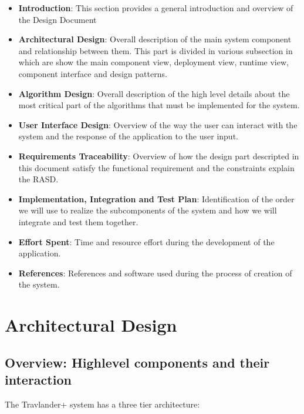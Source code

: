 \documentclass[numbers=noenddot, 12pt, a4paper, oneside]{scrbook}
\begin{document}
\begin{itemize}
	\item \textbf{Introduction}: This section provides a general introduction and overview of the Design Document
	\item \textbf{Architectural Design}: Overall description of the main system component and relationship between them. This part is divided in various subsection in which are show the main component view, deployment view, runtime view, component interface and design patterns.
	\item \textbf{Algorithm Design}: Overall description of the high level details about the most critical part of the algorithms that must be implemented for the system.
	\item \textbf{User Interface Design}: Overview of the way the user can interact with the system and the response of the application to the user input.
	\item \textbf{Requirements Traceability}: Overview of how the design part descripted in this document
	satisfy the functional requirement and the constraints explain the RASD.
	\item \textbf{Implementation, Integration and Test Plan}: Identification of the order we will use to realize the subcomponents of the system and how we will integrate and test them together.
	\item \textbf{Effort Spent}: Time and resource effort during the development of the application.
	\item \textbf{References}: References and software used during the process of creation of the system.
\end{itemize}



\chapter{Architectural Design}

\section{Overview: Highlevel components	and their interaction}

The Travlander+ system has a three tier architecture:
\end{document}
